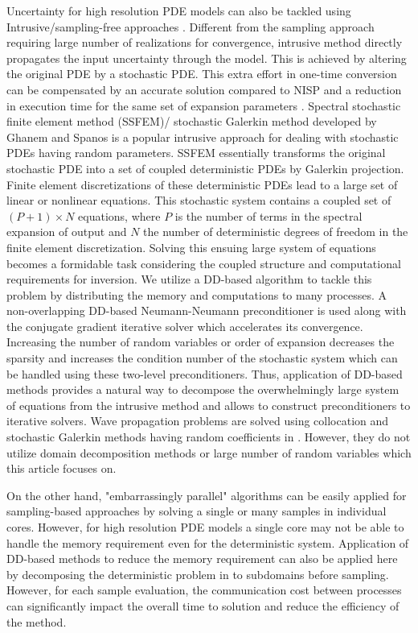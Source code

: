 \documentclass{article}
\begin{document}
\textcolor{ss}{Uncertainty for high resolution PDE models can also be tackled using Intrusive/sampling-free approaches \cite{book_ghanem}. Different from the sampling approach requiring large number of realizations for convergence, intrusive method directly propagates the input uncertainty through the model. This is achieved by altering the original PDE by a stochastic PDE. This extra effort in one-time conversion can be compensated by an accurate solution compared to NISP and a reduction in execution time for the same set of expansion parameters \cite{compare_phipps}. Spectral stochastic finite element method (SSFEM)/ stochastic Galerkin method developed by Ghanem and Spanos \cite{book_ghanem} is a popular intrusive approach for dealing with stochastic PDEs having random parameters. SSFEM essentially transforms the original stochastic PDE into a set of coupled deterministic PDEs by Galerkin projection. Finite element discretizations of these deterministic PDEs lead to a large set of linear or nonlinear equations. This stochastic system contains a coupled set of $(P+1) \times N$ equations, where $P$ is the number of terms in the spectral expansion of output and $N$ the number of deterministic degrees of freedom in the finite element discretization. Solving this ensuing large system of equations becomes a formidable task considering the coupled structure and computational requirements for inversion. We utilize a DD-based algorithm to tackle this problem by distributing the memory and computations to many processes. A non-overlapping DD-based Neumann-Neumann preconditioner is used along with the conjugate gradient iterative solver which accelerates its convergence. Increasing the number of random variables or order of expansion decreases the sparsity and increases the condition number of the stochastic system which can be handled using these two-level preconditioners. Thus, application of DD-based methods provides a natural way to decompose the overwhelmingly large system of equations from the intrusive method and allows to construct preconditioners to iterative solvers. Wave propagation problems are solved using collocation and stochastic Galerkin methods having random coefficients in \cite{elasticw_sto2d,xiu_wave,SG_app_SWE,SG_application_porousmedia,wave_UQ,wave_MultiLevelMC}.
However, they do not utilize domain decomposition methods or large number of random variables which this article focuses on.}

\textcolor{ss}{On the other hand, "embarrassingly parallel" algorithms can be easily applied for sampling-based approaches by solving a single or many samples in individual cores. However, for high resolution PDE models a single core may not be able to handle the memory requirement even for the deterministic system. Application of DD-based methods to reduce the memory requirement can also be applied here by decomposing the deterministic problem in to subdomains before sampling. However, for each sample evaluation, the communication cost between processes can significantly impact the overall time to solution and reduce the efficiency of the method.}
\end{document}
